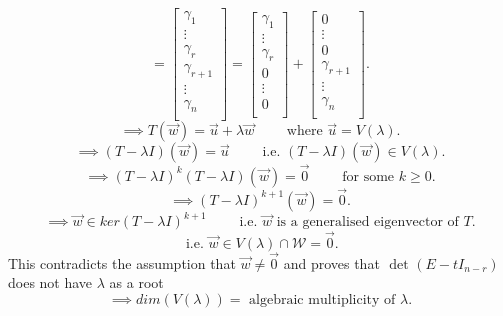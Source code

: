 \documentclass{report}
\begin{document}
{\begin{enumerate}[label=(\arabic*).]
     \[
     = \begin{bmatrix}
     \gamma_1\\
     \vdots\\
     \gamma_r\\
     \gamma_{r+1}\\
     \vdots\\
     \gamma_n\\
     \end{bmatrix}
     = \begin{bmatrix}
     \gamma_1\\
     \vdots\\
     \gamma_r\\
     0\\
     \vdots\\
     0\\
     \end{bmatrix}
     + \begin{bmatrix}
     0\\
     \vdots\\
     0\\
     \gamma_{r+1}\\
     \vdots \\
     \gamma_n\\
     \end{bmatrix}
     .\] 
     \[
     \implies T \left( \vec{ w}  \right) = \vec{ u} + \lambda \vec{ w} \qquad  \text{ where } \vec{ u} = V \left( \lambda \right) 
     .\] 
     \[
     \implies \left( T - \lambda I \right) \left( \vec{ w}  \right) = \vec{ u} \qquad  \text{ i.e. }  \left( T - \lambda I \right) \left( \vec{ w}  \right) \in V \left( \lambda \right)
     .\] 
     \[
     \implies \left( T - \lambda I \right) ^{k} \left( T - \lambda I \right) \left( \vec{ w}  \right) = \vec{ 0} \qquad  \text{ for some }   k \geq 0
     .\] 
     \[
     \implies \left( T - \lambda I \right) ^{k+1} \left( \vec{ w}  \right) = \vec{ 0} 
     .\] 
     \[
	     \implies \vec{ w} \in ker \left( T -\lambda I \right) ^{k+1} \qquad  \text{ i.e. } \vec{ w}  \text{ is a generalised eigenvector of  } T
     .\] 
     \[
	     \text{ i.e. } \vec{ w} \in V \left( \lambda \right) \cap \mathcal{W}  = { \vec{ 0} } 
     .\] 
     This contradicts the assumption that $ \vec{ w} \neq \vec{ 0}$ and proves that $ \text{ det } \left( E - t I_{n-r} \right) $ does not have $ \lambda$ as a root
     \[
     \implies dim \left( V \left( \lambda \right)  \right) = \text{ algebraic multiplicity of } \lambda
     .\] 
    \end{enumerate}
    
   }
\end{document}
